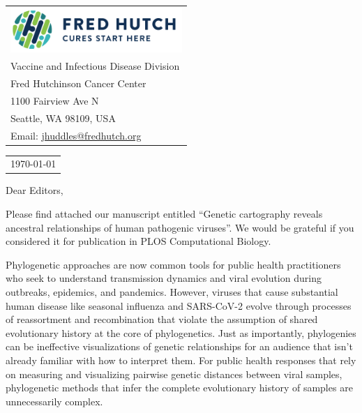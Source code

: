 \documentclass[11pt]{article}
\begin{document}
\thispagestyle{empty} %

\mbox{}\hfill
\begin{tabular}{l @{}}
	\includegraphics[width=6.5cm]{fhcc_logo} \\
	Vaccine and Infectious Disease Division \\
	Fred Hutchinson Cancer Center \\
	1100 Fairview Ave N \\
	Seattle, WA 98109, USA \\
	Email: \href{mailto:jhuddles@fredhutch.org}{jhuddles@fredhutch.org} \\
\end{tabular}

\vspace{0.1in} %

\begin{tabular}{@{} l}
  \today
\end{tabular}

\vspace{0.1in} %

Dear Editors,

\medskip %

Please find attached our manuscript entitled ``Genetic cartography reveals ancestral relationships of human pathogenic viruses''.
We would be grateful if you considered it for publication in PLOS Computational Biology.

Phylogenetic approaches are now common tools for public health practitioners who seek to understand transmission dynamics and viral evolution during outbreaks, epidemics, and pandemics.
However, viruses that cause substantial human disease like seasonal influenza and SARS-CoV-2 evolve through processes of reassortment and recombination that violate the assumption of shared evolutionary history at the core of phylogenetics.
Just as importantly, phylogenies can be ineffective visualizations of genetic relationships for an audience that isn't already familiar with how to interpret them.
For public health responses that rely on measuring and visualizing pairwise genetic distances between viral samples, phylogenetic methods that infer the complete evolutionary history of samples are unnecessarily complex.
\end{document}
